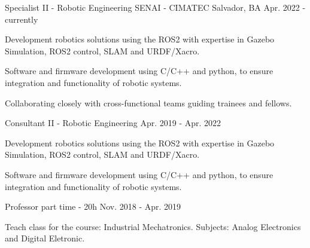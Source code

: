 

\begin{cventries}

\cventry
  {Specialist II - Robotic Engineering} %
  {SENAI - CIMATEC} %
  {Salvador, BA} %
  {Apr. 2022 - currently} %
  {
    \begin{cvitems} %
      \item {Development robotics solutions using the ROS2 with expertise in Gazebo Simulation, ROS2 control, SLAM and URDF/Xacro.}
      \item {Software and firmware development using C/C++ and python, to ensure integration and functionality of robotic systems.}
      \item {Collaborating closely with cross-functional teams guiding trainees and fellows.}
    \end{cvitems}
  }

\cventry
  {Consultant II - Robotic Engineering} %
  {} %
  {} %
  {Apr. 2019 - Apr. 2022} %
  {
    \begin{cvitems} %
      \item {Development robotics solutions using the ROS2 with expertise in Gazebo Simulation, ROS2 control, SLAM and URDF/Xacro.}
      \item {Software and firmware development using C/C++ and python, to ensure integration and functionality of robotic systems.}
    \end{cvitems}
  }

  \cventry
    {Professor part time - 20h} %
    {} %
    {} %
    {Nov. 2018 - Apr. 2019} %
    {
      \begin{cvitems} %
        \item {Teach class for the course: Industrial Mechatronics. Subjects: Analog Electronics and Digital Eletronic.}
      \end{cvitems}
    }


\end{cventries}
